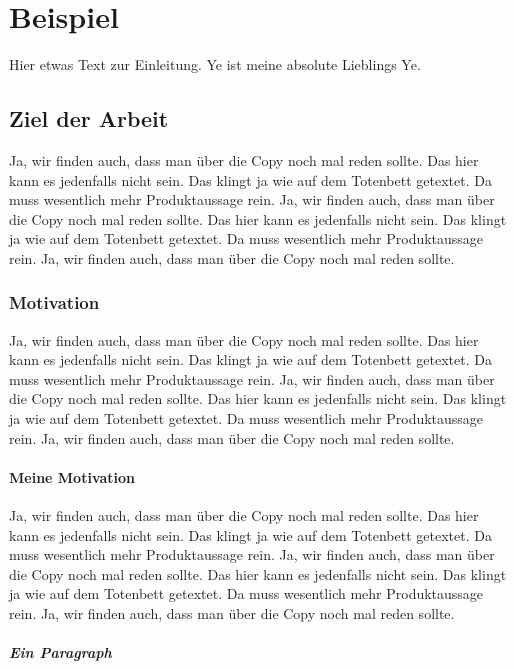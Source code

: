 

\chapter{Beispiel}

Hier etwas Text zur Einleitung. Ye ist meine absolute Lieblings Ye.


\section{Ziel der Arbeit}

Ja, wir finden auch, dass man über die Copy noch mal reden sollte. Das hier kann es jedenfalls nicht sein. Das klingt ja wie auf dem Totenbett getextet. Da muss wesentlich mehr Produktaussage rein. Ja, wir finden auch, dass man über die Copy noch mal reden sollte. Das hier kann es jedenfalls nicht sein. Das klingt ja wie auf dem Totenbett getextet. Da muss wesentlich mehr Produktaussage rein. Ja, wir finden auch, dass man über die Copy noch mal reden sollte.


\subsection{Motivation}

Ja, wir finden auch, dass man über die Copy noch mal reden sollte. Das hier kann es jedenfalls nicht sein. Das klingt ja wie auf dem Totenbett getextet. Da muss wesentlich mehr Produktaussage rein. Ja, wir finden auch, dass man über die Copy noch mal reden sollte. Das hier kann es jedenfalls nicht sein. Das klingt ja wie auf dem Totenbett getextet. Da muss wesentlich mehr Produktaussage rein. Ja, wir finden auch, dass man über die Copy noch mal reden sollte.


\subsubsection{Meine Motivation}

Ja, wir finden auch, dass man über die Copy noch mal reden sollte. Das hier kann es jedenfalls nicht sein. Das klingt ja wie auf dem Totenbett getextet. Da muss wesentlich mehr Produktaussage rein. Ja, wir finden auch, dass man über die Copy noch mal reden sollte. Das hier kann es jedenfalls nicht sein. Das klingt ja wie auf dem Totenbett getextet. Da muss wesentlich mehr Produktaussage rein. Ja, wir finden auch, dass man über die Copy noch mal reden sollte.


\paragraph{Ein Paragraph}

